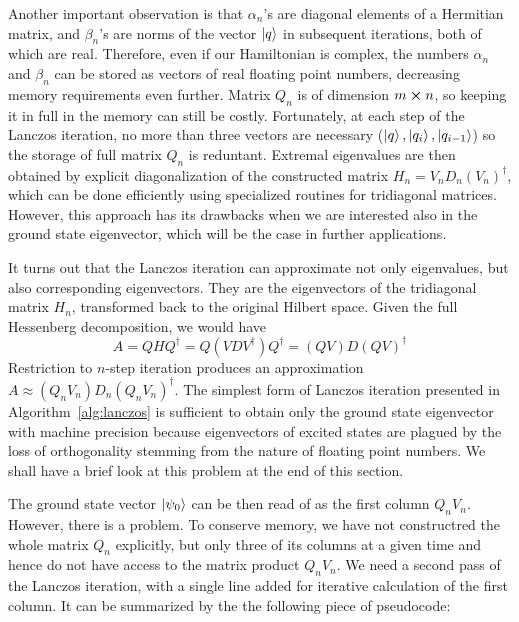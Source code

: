 Another important observation is that \(\alpha_n\)'s are diagonal elements of a Hermitian matrix, and \(\beta_n\)'s are
norms of the vector \(\ket{q}\) in subsequent iterations, both of which are real. Therefore, even if our Hamiltonian is
complex, the numbers \(\alpha_n\) and \(\beta_n\) can be stored as vectors of real floating point numbers, decreasing
memory requirements even further. 
Matrix \(Q_n\) is of dimension \(m \cross n\), so keeping it in full in the memory can still be costly. Fortunately,
at each step of the Lanczos iteration, no more than three vectors are necessary (\(\ket{q},\ket{q_i},\ket{q_{i-1}}\))
so the storage of full matrix \(Q_n\) is reduntant. Extremal eigenvalues are then obtained by explicit diagonalization
of the constructed matrix \(H_n = V_n D_n (V_n)^{\dagger}\), which can be done efficiently using specialized routines
for tridiagonal matrices. However, this approach has its drawbacks when we are interested also in the ground state
eigenvector, which will be the case in further applications. 

It turns out that the Lanczos iteration can approximate not only eigenvalues,
but also corresponding eigenvectors. They are the eigenvectors of the tridiagonal matrix \(H_n\), transformed back
to the original Hilbert space. Given the full Hessenberg decomposition, we would have
\begin{equation}
	A = Q H Q^{\dagger} = Q (VDV^{\dagger}) Q^{\dagger} = (QV)D(QV)^{\dagger}
	\label{eq:factorization}
\end{equation}
Restriction to \(n\)-step iteration produces an approximation \(A\approx (Q_n V_n)D_n(Q_n V_n)^{\dagger}\).
The simplest form of Lanczos iteration presented in Algorithm~\ref{alg:lanczos} is sufficient to obtain
only the ground state eigenvector with machine precision because eigenvectors of excited states are plagued
by the loss of orthogonality stemming from the nature of floating point numbers. We shall have a brief look at this problem
at the end of this section.

The ground state vector \(\ket{\psi_0}\) can be then read of as the first column \(Q_n V_n\). However, there is a problem.
To conserve memory, we have not constructred the whole matrix \(Q_n\) explicitly, but only three of its columns 
at a given time and hence do not have access to the matrix product \(Q_n V_n\). We need a second pass of the Lanczos
iteration, with a single line added for iterative calculation of the first column. It can be summarized by the
the following piece of pseudocode:

